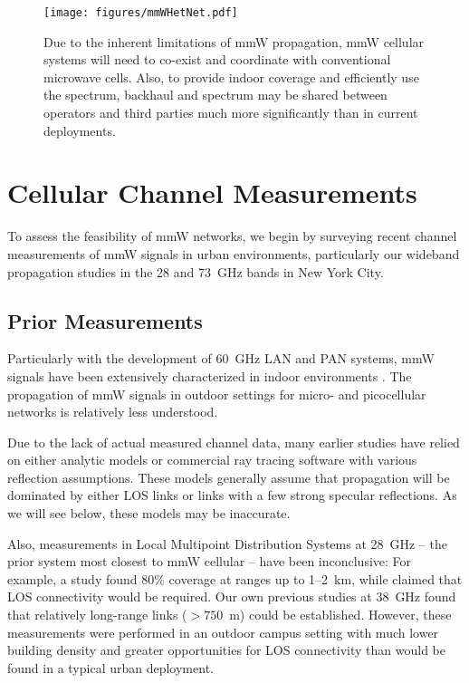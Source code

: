 \documentclass[journal]{IEEEtran}
\begin{document}
\begin{figure}
\begin{center}
    \texttt{[image: figures/mmWHetNet.pdf]}
\end{center}
\caption{Due to the inherent limitations of mmW propagation,
mmW cellular systems will need to co-exist and coordinate with
conventional microwave cells.  Also, to provide indoor coverage and
efficiently use the spectrum, backhaul and spectrum may be shared between
operators and third parties much more significantly than in current
deployments.
}
\label{fig:mmWHetNet}
\vspace{-0.1in}
\end{figure}

\section{Cellular Channel Measurements} \label{sec:chanMeas}

To assess the feasibility of mmW networks, we begin by surveying
recent channel measurements of mmW signals in urban environments,
particularly our wideband propagation studies in the
28 and 73~GHz bands in New York City.

\subsection{Prior Measurements}

Particularly with the development of 60~GHz LAN and PAN systems, mmW signals have been
extensively characterized in indoor environments
\cite{Ted:60Gstate11,Daniels:10,Zwick05,Giannetti:99,Anderson04,Smulders,Manabe,ben2011millimeter,ted2}.
The propagation of mmW signals in outdoor settings for micro- and
picocellular networks is relatively less understood.

Due to the lack of actual measured channel data,
many earlier studies \cite{KhanPi:11,ZhangMadhow1,AkoumAyaHeath:12,PietBRPC:12}
have relied on either analytic models or commercial ray tracing software
with various reflection assumptions.
These models
generally assume that propagation will be dominated by either LOS links or
links with a few strong specular reflections.  As we will see below,
these models may be inaccurate.

Also, measurements in Local Multipoint Distribution Systems at 28~GHz
-- the prior system most closest to mmW cellular --
have been inconclusive:
For example, a study \cite{ElrefShak:97} found 80\% coverage at ranges
up to 1--2~km, while \cite{SeiArn:95} claimed that LOS connectivity would be
required.  Our own previous
studies at 38~GHz \cite{Rappaport:13-BBmmW,Rappaport38:12,ted:rww12,ted:wcnc12,Rappaport-72GHz:13} found that relatively long-range
links ($> 750$~m) could be established.  However, these measurements
were performed in an outdoor
campus setting with much lower building density and
greater opportunities for LOS connectivity than would be found in a typical
urban deployment.
\end{document}
